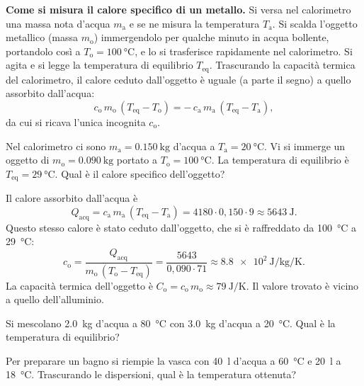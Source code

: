\textbf{Come si misura il calore specifico di un metallo.} Si versa nel calorimetro una massa nota d'acqua $m_\text{a}$ e se ne misura la temperatura $T_\text{a}$. Si scalda l'oggetto metallico (massa $m_\text{o}$) immergendolo per qualche minuto in acqua bollente, portandolo così a $T_\text{o} = \SI{100}{\celsius}$, e lo si trasferisce rapidamente nel calorimetro. Si agita e si legge la temperatura di equilibrio $T_\text{eq}$. Trascurando la capacità termica del calorimetro, il calore ceduto dall'oggetto è uguale (a parte il segno) a quello assorbito dall'acqua:
\[ c_\text{o}\,m_\text{o}\,(T_\text{eq} - T_\text{o}) = -\,c_\text{a}\,m_\text{a}\,(T_\text{eq} - T_\text{a}), \]
da cui si ricava l'unica incognita $c_\text{o}$.

\begin{testexample}
Nel calorimetro ci sono $m_\text{a} = \SI{0,150}{\kilogram}$ d'acqua a $T_\text{a} = \SI{20}{\celsius}$. Vi si immerge un oggetto di $m_\text{o} = \SI{0,090}{\kilogram}$ portato a $T_\text{o} = \SI{100}{\celsius}$. La temperatura di equilibrio è $T_\text{eq} = \SI{29}{\celsius}$. Qual è il calore specifico dell'oggetto?

Il calore assorbito dall'acqua è
\[ Q_\text{acq} = c_\text{a}\,m_\text{a}\,(T_\text{eq} - T_\text{a}) = 4180 \cdot 0{,}150 \cdot 9 \approx \SI{5643}{\joule}. \]
Questo stesso calore è stato ceduto dall'oggetto, che si è raffreddato da \SI{100}{\celsius} a \SI{29}{\celsius}:
\[ c_\text{o} = \frac{Q_\text{acq}}{m_\text{o}\,(T_\text{o} - T_\text{eq})} = \frac{5643}{0{,}090 \cdot 71} \approx \SI{8,8e2}{\joule\per\kilogram\per\kelvin}. \]
La capacità termica dell'oggetto è $C_\text{o} = c_\text{o}\,m_\text{o} \approx \SI{79}{\joule\per\kelvin}$. Il valore trovato è vicino a quello dell'alluminio.
\end{testexample}

\begin{esercizio}
Si mescolano \SI{2,0}{\kilogram} d'acqua a \SI{80}{\celsius} con \SI{3,0}{\kilogram} d'acqua a \SI{20}{\celsius}. Qual è la temperatura di equilibrio?\\
\end{esercizio}

\begin{esercizio}
Per preparare un bagno si riempie la vasca con \SI{40}{\litre} d'acqua a \SI{60}{\celsius} e \SI{20}{\litre} a \SI{18}{\celsius}. Trascurando le dispersioni, qual è la temperatura ottenuta?\\
\end{esercizio}

